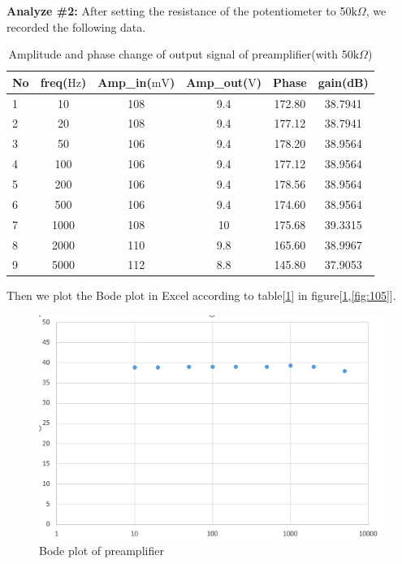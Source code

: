 \textbf{Analyze \#2:} \newline
\phantom{ } After setting the resistance of the potentiometer to 50$ \si{\kilo\Omega} $, we recorded the following data.
\begin{table}[!htbp]
	\centering
	\caption{Amplitude and phase change of output signal of preamplifier(with 50$ \si{\kilo\Omega} $)}
	\begin{tabular}{lccccc}
		\toprule
		No &freq($\si{\hertz}$) &Amp\_in($\si{\milli\volt}$)&Amp\_out($\si{\volt}$)&Phase&gain(dB)\\
		\midrule
		1	&10		&108	&9.4	&172.80	&38.7941\\
		2	&20		&108	&9.4	&177.12	&38.7941\\
		3	&50		&106	&9.4	&178.20	&38.9564\\
		4	&100	&106	&9.4	&177.12	&38.9564\\
		5	&200	&106	&9.4	&178.56	&38.9564\\
		6	&500	&106	&9.4	&174.60	&38.9564\\
		7	&1000	&108	&10		&175.68	&39.3315\\
		8	&2000	&110	&9.8	&165.60	&38.9967\\
		9	&5000	&112	&8.8	&145.80	&37.9053\\
		\bottomrule
	\end{tabular}
	\label{tab:preamp50}
\end{table}

\phantom{ } Then we plot the Bode plot in Excel according to table[\ref{tab:preamp50}] in figure[\ref{fig:104},\ref{fig:105}].
\begin{figure}[!htbp]
	\centering 
	\begin{framed}
		\includegraphics[width=\linewidth]{images/1_3.PNG} 
		\caption{Bode plot of preamplifier}
		\label{fig:104} 
	\end{framed}
\end{figure} 

